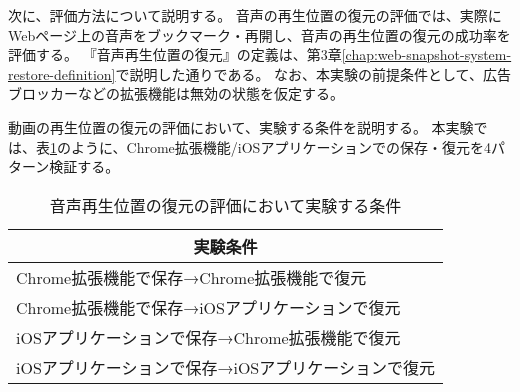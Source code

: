 次に、評価方法について説明する。
音声の再生位置の復元の評価では、実際にWebページ上の音声をブックマーク・再開し、音声の再生位置の復元の成功率を評価する。
『音声再生位置の復元』の定義は、第3章\ref{chap:web-snapshot-system-restore-definition}で説明した通りである。
なお、本実験の前提条件として、広告ブロッカーなどの拡張機能は無効の状態を仮定する。

動画の再生位置の復元の評価において、実験する条件を説明する。
本実験では、表\ref{tb:evl-audio-audio-conditions}のように、Chrome拡張機能/iOSアプリケーションでの保存・復元を4パターン検証する。

\begin{table}[htbp]
  \label{tb:evl-audio-audio-conditions}
  \caption{音声再生位置の復元の評価において実験する条件}
  \begin{center}
    \begin{tabular}{|l|}
    \hline
    \multicolumn{1}{|c|}{\textbf{実験条件}} \\\hline
    Chrome拡張機能で保存→Chrome拡張機能で復元 \\ \hline
    Chrome拡張機能で保存→iOSアプリケーションで復元 \\ \hline
    iOSアプリケーションで保存→Chrome拡張機能で復元 \\ \hline
    iOSアプリケーションで保存→iOSアプリケーションで復元 \\ \hline
    \end{tabular}
  \end{center}
\end{table}
